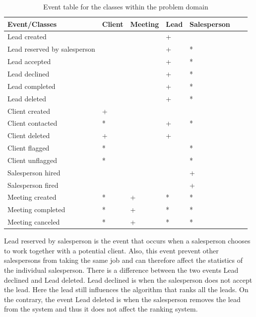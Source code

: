 \begin{table}[H]
\begin{tabular}{|l|l|l|l|l|l|l|}
\hline
\textbf{Event/Classes}    & Client & Meeting   & Lead  & Salesperson
\\ \hline
Lead created       &        &                 & +       &
\\ \hline
Lead reserved by salesperson     
                    &       &       & +       & *
\\ \hline
Lead accepted       &       &       & +       & * 
\\ \hline
Lead declined       &       &       & +       & *
\\ \hline
Lead completed      &       &       & +       & *
\\ \hline
Lead deleted        &       &       & +       & *
\\ \hline
Client created      & +      &      &         &   
\\ \hline
Client contacted    & *      &      &  +      & *
\\ \hline
Client deleted      & +      &      &  +      &       
\\ \hline
Client flagged      & *      &      &         & *      
\\ \hline
Client unflagged    & *      &      &         & *     
\\ \hline
Salesperson hired   &        &      &         & +      
\\ \hline
Salesperson fired   &        &      &         & +     
\\ \hline
Meeting created     &  *     &   +  &     *   & *
\\ \hline
Meeting completed   &  *     &   +   &     *   &*
\\ \hline
Meeting canceled    &  *     &    +  &    *    & *
\\ \hline
\end{tabular}
\caption{Event table for the classes within the problem domain}
\label{tab:EventTable}
\end{table}

Lead reserved by salesperson is the event that occurs when a salesperson chooses to work together with a potential client. Also, this event prevent other salespersons from taking the same job and can therefore affect the statistics of the individual salesperson.
There is a difference between the two events Lead declined and Lead deleted. Lead declined is when the salesperson does not accept the lead. Here the lead still influences the algorithm that ranks all the leads. On the contrary, the event Lead deleted is when the salesperson removes the lead from the system and thus it does not affect the ranking system.

